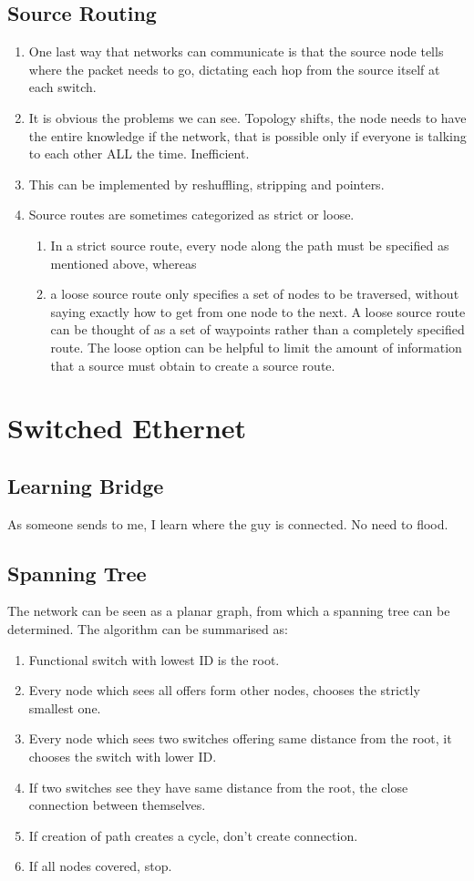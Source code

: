 \documentclass[12pt]{book}
\begin{document}
\subsection{Source Routing}
\begin{enumerate}
    \item One last way that networks can communicate is that the source node tells where the packet needs to go, dictating each hop from the source itself at each switch.
    \item It is obvious the problems we can see. Topology shifts, the node needs to have the entire knowledge if the network, that is possible only if everyone is talking to each other ALL the time. Inefficient.
    \item This can be implemented by reshuffling, stripping and pointers.
    \item Source routes are sometimes categorized as strict or loose. 
    \begin{enumerate}
        \item In a strict source route, every node along the path must be specified as mentioned above, whereas 
        \item a loose source route only specifies a set of nodes to be traversed, without saying exactly how to get from one node to the next. A loose source route can be thought of as a set of waypoints rather than a completely specified route. The loose option can be helpful to limit the amount of information that a source must obtain to create a source route.
    \end{enumerate}
\end{enumerate}

\section{Switched Ethernet}
\subsection{Learning Bridge}
As someone sends to me, I learn where the guy is connected. No need to flood.

\subsection{Spanning Tree}
The network can be seen as a planar graph, from which a spanning tree can be determined. The algorithm can be summarised as:
\begin{enumerate}
    \item Functional switch with lowest ID is the root.
    \item Every node which sees all offers form other nodes, chooses the strictly smallest one.
    \item Every node which sees two switches offering same distance from the root, it chooses the switch with lower ID.
    \item If two switches see they have same distance from the root, the close connection between themselves.
    \item If creation of path creates a cycle, don't create connection.
    \item If all nodes covered, stop.
\end{enumerate}
\end{document}
